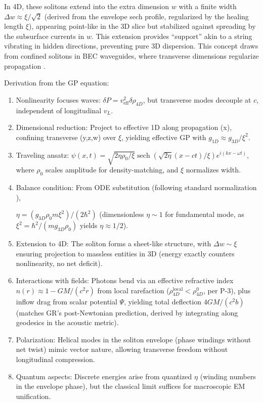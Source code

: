 \documentclass{article}
\DeclareMathOperator{\sech}{sech}
\begin{document}
In 4D, these solitons extend into the extra dimension $w$ with a finite width $\Delta w \approx \xi / \sqrt{2}$ (derived from the envelope sech profile, regularized by the healing length $\xi$), appearing point-like in the 3D slice but stabilized against spreading by the subsurface currents in $w$. This extension provides ``support'' akin to a string vibrating in hidden directions, preventing pure 3D dispersion. This concept draws from confined solitons in BEC waveguides, where transverse dimensions regularize propagation \cite{becker2008oscillations}.

Derivation from the GP equation:
\begin{enumerate}
    \item Nonlinearity focuses waves: $\delta P = v_{\text{eff}}^2 \delta \rho_{4D}$, but transverse modes decouple at $c$, independent of longitudinal $v_L$.
    \item Dimensional reduction: Project to effective 1D along propagation (x), confining transverse (y,z,w) over $\xi$, yielding effective GP with $g_{1D} \approx g_{3D}/\xi^2$.
    \item Traveling ansatz: $\psi(x,t) = \sqrt{2 \eta \rho_0 / \xi} \sech\left( \sqrt{2 \eta} (x - c t)/ \xi \right) e^{i (k x - \omega t)}$, where $\rho_0$ scales amplitude for density-matching, and $\xi$ normalizes width.
    \item Balance condition: From ODE substitution (following standard normalization \cite{pitaevskii2016bose}),
    
    $\eta = (g_{3D} \rho_0 m \xi^2)/(2\hbar^2)$ (dimensionless $\eta \sim 1$ for fundamental mode, as $\xi^2 = \hbar^2 / (m g_{3D} \rho_0)$ yields $\eta \approx 1/2$).
    \item Extension to 4D: The soliton forms a sheet-like structure, with $\Delta w \sim \xi$ ensuring projection to massless entities in 3D (energy exactly counters nonlinearity, no net deficit).
    \item Interactions with fields: Photons bend via an effective refractive index $n(r) \approx 1 - G M / (c^2 r)$ from local rarefaction ($\rho_{4D}^{\text{local}} < \rho_{4D}^0$, per P-3), plus inflow drag from scalar potential $\Psi$, yielding total deflection $4 G M / (c^2 b)$ (matches GR's post-Newtonian prediction, derived by integrating along geodesics in the acoustic metric).
    \item Polarization: Helical modes in the soliton envelope (phase windings without net twist) mimic vector nature, allowing transverse freedom without longitudinal compression.
    \item Quantum aspects: Discrete energies arise from quantized $\eta$ (winding numbers in the envelope phase), but the classical limit suffices for macroscopic EM unification.
\end{enumerate}
\end{document}
